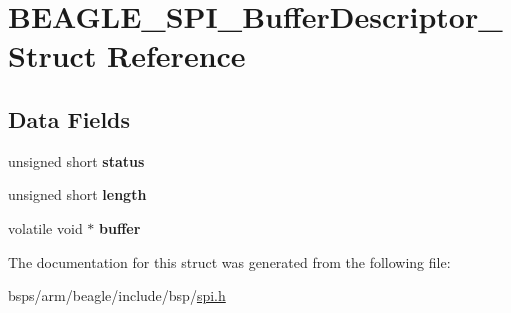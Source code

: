 \hypertarget{structBEAGLE__SPI__BufferDescriptor__}{}\section{B\+E\+A\+G\+L\+E\+\_\+\+S\+P\+I\+\_\+\+Buffer\+Descriptor\+\_\+ Struct Reference}
\label{structBEAGLE__SPI__BufferDescriptor__}
\subsection*{Data Fields}
\begin{DoxyCompactItemize}
\item 
\mbox{\label{structBEAGLE__SPI__BufferDescriptor___a693873120d54f66d0866cb5dce6319a7}} 
unsigned short {\bfseries status}
\item 
\mbox{\label{structBEAGLE__SPI__BufferDescriptor___afb25ab1f372f1b2bca0de4955a64cd9d}} 
unsigned short {\bfseries length}
\item 
\mbox{\label{structBEAGLE__SPI__BufferDescriptor___a1bab69d1fe08a5763d60eb1a3203f578}} 
volatile void $\ast$ {\bfseries buffer}
\end{DoxyCompactItemize}


The documentation for this struct was generated from the following file\+:\begin{DoxyCompactItemize}
\item 
bsps/arm/beagle/include/bsp/\mbox{\hyperlink{bsps_2arm_2beagle_2include_2bsp_2spi_8h}{spi.\+h}}\end{DoxyCompactItemize}
